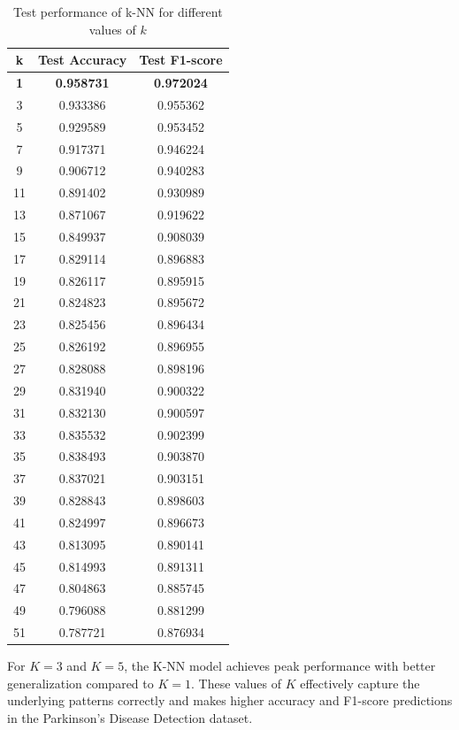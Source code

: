 \documentclass{article}
\begin{document}
\begin{table}[H]
\large
\centering
\begin{tabular}{|c|c|c|}
\hline
\textbf{k} & \textbf{Test Accuracy} & \textbf{Test F1-score} \\
\hline
\textbf{1}  & \textbf{0.958731} & \textbf{0.972024} \\ \hline
3  & 0.933386 & 0.955362 \\ \hline
5  & 0.929589 & 0.953452 \\ \hline
7  & 0.917371 & 0.946224 \\ \hline
9  & 0.906712 & 0.940283 \\ \hline
11 & 0.891402 & 0.930989 \\ \hline
13 & 0.871067 & 0.919622 \\ \hline
15 & 0.849937 & 0.908039 \\ \hline
17 & 0.829114 & 0.896883 \\ \hline
19 & 0.826117 & 0.895915 \\ \hline
21 & 0.824823 & 0.895672 \\ \hline
23 & 0.825456 & 0.896434 \\ \hline
25 & 0.826192 & 0.896955 \\ \hline
27 & 0.828088 & 0.898196 \\ \hline
29 & 0.831940 & 0.900322 \\ \hline
31 & 0.832130 & 0.900597 \\ \hline
33 & 0.835532 & 0.902399 \\ \hline
35 & 0.838493 & 0.903870 \\ \hline
37 & 0.837021 & 0.903151 \\ \hline
39 & 0.828843 & 0.898603 \\ \hline
41 & 0.824997 & 0.896673 \\ \hline
43 & 0.813095 & 0.890141 \\ \hline
45 & 0.814993 & 0.891311 \\ \hline
47 & 0.804863 & 0.885745 \\ \hline
49 & 0.796088 & 0.881299 \\ \hline
51 & 0.787721 & 0.876934 \\ \hline
\end{tabular}
\caption{Test performance of k-NN for different values of $k$}
\end{table}


For $K = 3$ and $K = 5$, the K-NN model achieves peak performance with better generalization compared to $K = 1$. These values of $K$ effectively capture the underlying patterns correctly and makes higher accuracy and F1-score predictions in the Parkinson's Disease Detection dataset.
\end{document}
